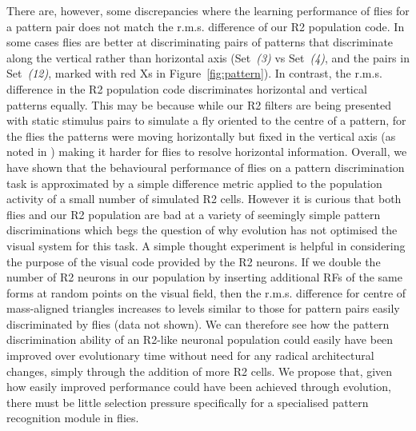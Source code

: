 \documentclass[10pt]{article}
\begin{document}
There are, however, some discrepancies where the learning performance of flies for a pattern pair does not match the r.m.s. difference of our R2 population code. In some cases flies are better at discriminating pairs of patterns that discriminate along the vertical rather than horizontal axis (Set~\emph{(3)} vs Set~\emph{(4)}, and the pairs in Set~\emph{(12)}, marked with red Xs in Figure~\ref{fig:pattern}). In contrast, the r.m.s. difference in the R2 population code discriminates horizontal and vertical patterns equally. This may be because while our R2 filters are being presented with static stimulus pairs to simulate a fly oriented to the centre of a pattern, for the flies the patterns were moving horizontally but fixed in the vertical axis (as noted in \cite{Ernst1999}) making it harder for flies to resolve horizontal information. 
Overall, we have shown that the behavioural performance of flies on a pattern discrimination task is approximated by a simple difference metric applied to the population activity of a small number of simulated R2 cells. However it is curious that both flies and our R2 population are bad at a variety of seemingly simple pattern discriminations which begs the question of why evolution has not optimised the visual system for this task. A simple thought experiment is helpful in considering the purpose of the visual code provided by the R2 neurons. If we double the number of R2 neurons in our population by inserting additional RFs of the same forms at random points on the visual field, then the r.m.s. difference for centre of mass-aligned triangles increases to levels similar to those for pattern pairs easily discriminated by flies (data not shown). We can therefore see how the pattern discrimination ability of an R2-like neuronal population could easily have been improved over evolutionary time without need for any radical architectural changes, simply through the addition of more R2 cells. We propose that, given how easily improved performance could have been achieved through evolution, there must be little selection pressure specifically for a specialised pattern recognition module in flies.

\begin{comment}
Sig:
above: 8; below: 0; eq: 0; not given: 0; tot: 8
------
NS:
above: 5; below: 13; eq: 0; not given: 1; tot: 19
------
Sig not given:
above: 3; eq: 3; below: 0; not given: 3; tot: 9
------
tot tot: 36
\end{comment}
\end{document}
